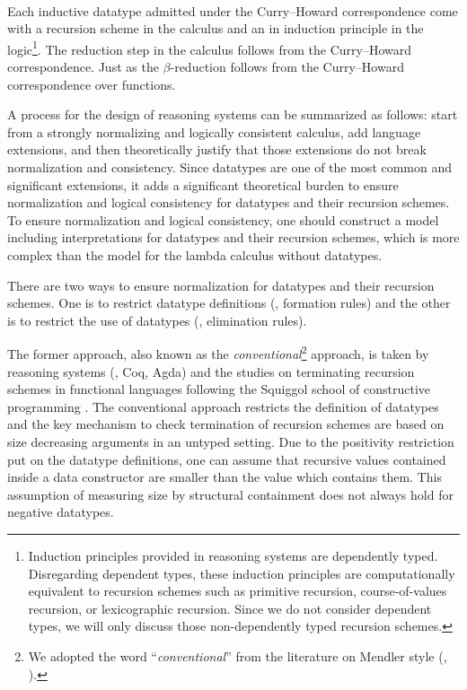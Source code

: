 \paragraph{}
Each inductive datatype admitted under the Curry--Howard correspondence
come with a recursion scheme in the calculus and an in induction principle in the logic\footnote{
        Induction principles provided in reasoning systems are
        dependently typed. Disregarding dependent types, these
        induction principles are computationally equivalent to
        recursion schemes such as primitive recursion,
        course-of-values recursion, or lexicographic recursion.
        Since we do not consider dependent types, we will only discuss
        those non-dependently typed recursion schemes.}.
The reduction step in the calculus follows from the Curry--Howard correspondence.
Just as the $\beta$-reduction follows from
the Curry--Howard correspondence over functions. 

A process for the design 
of reasoning systems can be summarized as follows: 
start from a strongly normalizing and logically consistent calculus,
add language extensions, and then theoretically justify that those extensions
do not break normalization and consistency. Since datatypes are one of the most
common and significant extensions, it adds a significant theoretical burden to
ensure normalization and logical consistency for datatypes and their recursion
schemes. To ensure normalization and logical consistency, one should construct
a model including interpretations for datatypes and their recursion schemes,
which is more complex than the model for the lambda calculus without datatypes.

There are two ways to ensure normalization for datatypes and their recursion
schemes. One is to restrict datatype definitions (\ie, formation rules) and
the other is to restrict the use of datatypes (\ie, elimination rules).

The former approach, also known as the \emph{conventional}\footnote{
        We adopted the word ``\emph{conventional}'' from the literature
        on Mendler style (\eg, \cite{AbeMat04}).}
approach, is taken by reasoning systems (\eg, Coq, Agda) and the studies on
terminating recursion schemes in functional languages following
the Squiggol school of constructive programming \cite{AoP,hagino87phd,Bir87}.
The conventional approach restricts the definition of datatypes and
the key mechanism to check termination of recursion schemes are based on
size decreasing arguments in an untyped setting. Due to the positivity
restriction put on the datatype definitions, one can assume that
recursive values contained inside a data constructor are smaller than
the value which contains them. This assumption of measuring size by
structural containment does not always hold for negative datatypes.

